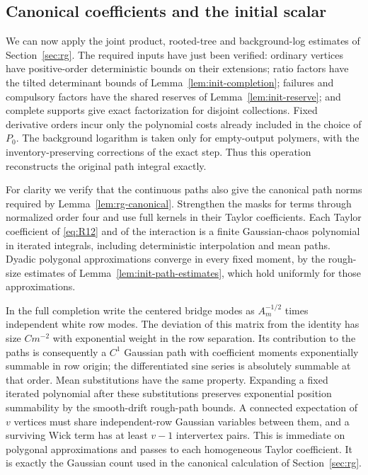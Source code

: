 \subsection{Canonical coefficients and the initial scalar}

We can now apply the joint product, rooted-tree and background-log
estimates of Section~\ref{sec:rg}.  The required inputs have just been
verified: ordinary vertices have positive-order deterministic bounds
on their extensions; ratio factors have the tilted determinant bounds
of Lemma~\ref{lem:init-completion}; failures and compulsory factors have
the shared reserves of Lemma~\ref{lem:init-reserve}; and complete supports
give exact factorization for disjoint collections.  Fixed derivative
orders incur only the polynomial costs already included in the choice
of $P_0$.  The background logarithm is taken only for empty-output
polymers, with the inventory-preserving corrections of the exact step.
Thus this operation reconstructs the original path integral exactly.

For clarity we verify that the continuous paths also give the canonical
path norms required by Lemma~\ref{lem:rg-canonical}.  Strengthen the masks
for terms through normalized order four and use full kernels in their
Taylor coefficients.  Each Taylor coefficient of \eqref{eq:R12} and of
the interaction is a finite Gaussian-chaos polynomial in iterated
integrals, including deterministic interpolation and mean paths.
Dyadic polygonal approximations converge in every fixed moment, by the
rough-size estimates of Lemma~\ref{lem:init-path-estimates}, which hold
uniformly for those approximations.

In the full completion write the centered bridge modes as
$A_m^{-1/2}$ times independent white row modes.  The deviation of this
matrix from the identity has size $Cm^{-2}$ with exponential weight in
the row separation.  Its contribution to the paths is consequently a
$C^1$ Gaussian path with coefficient moments exponentially summable in
row origin; the differentiated sine series is absolutely summable at
that order.  Mean substitutions have the same property.  Expanding a
fixed iterated polynomial after these substitutions preserves exponential
position summability by the smooth-drift rough-path bounds.  A connected
expectation of $v$ vertices must share independent-row Gaussian variables
between them, and a surviving Wick term has at least $v-1$ intervertex
pairs.  This is immediate on polygonal approximations and passes to
each homogeneous Taylor coefficient.  It is exactly the Gaussian
count used in the canonical calculation of Section~\ref{sec:rg}.

